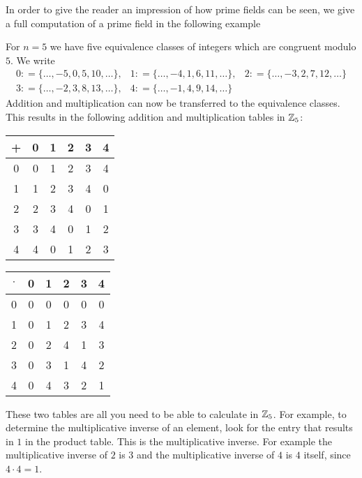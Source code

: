 In order to give the reader an impression of how prime fields can be seen, we give a full computation of a prime field in the following example
\begin{example} 
\label{primkoerper_z_5}
For $ n = 5 $ we have five equivalence classes of integers which are congruent modulo $ 5 $. We write
$$
\begin{array}{ccc}
0: = \{\ldots, -5,0,5,10, \ldots \}, &
1: = \{\ldots, -4,1,6,11, \ldots \}, &
2: = \{\ldots, -3,2,7,12, \ldots \} \\
3: = \{\ldots, -2,3,8,13, \ldots \}, &
4: = \{\ldots, -1,4,9,14, \ldots \}
\end{array}
$$
Addition and multiplication can now be transferred to the equivalence classes. This results in the following addition and multiplication tables in $ \mathbb{Z}_5 $:
\begin{center}
  \begin{tabular}{c | c c c c c}
    + & 0 & 1 & 2 & 3 & 4 \\\hline
    0 & 0 & 1 & 2 & 3 & 4 \\
    1 & 1 & 2 & 3 & 4 & 0 \\
    2 & 2 & 3 & 4 & 0 & 1 \\
    3 & 3 & 4 & 0 & 1 & 2 \\
    4 & 4 & 0 & 1 & 2 & 3 \\
  \end{tabular} \quad \quad \quad \quad
  \begin{tabular}{c | c c c c c}
$ \cdot $ & 0 & 1 & 2 & 3 & 4 \\\hline
      0 & 0 & 0 & 0 & 0 & 0 \\
      1 & 0 & 1 & 2 & 3 & 4 \\
      2 & 0 & 2 & 4 & 1 & 3 \\
      3 & 0 & 3 & 1 & 4 & 2 \\
      4 & 0 & 4 & 3 & 2 & 1 \\
  \end{tabular}
\end{center}

These two tables are all you need to be able to calculate in $ \mathbb{Z}_5 $. For example, to determine the multiplicative inverse of an element, look for the entry that results in $ 1 $ in the product table. This is the multiplicative inverse. For example the multiplicative inverse of $ 2 $ is $ 3 $ and the multiplicative inverse of $4$ is $4$ itself, since $4\cdot 4=1$.
\end{example}



